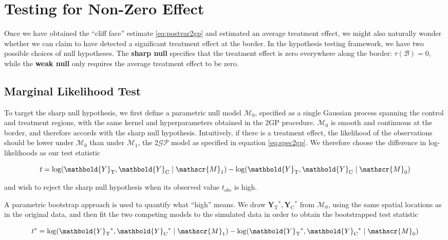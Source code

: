\documentclass[letter]{article}
\DeclarePairedDelimiter{\parenthesis}{\lparen}{\rparen}
\newcommand{\del}[1]{\parenthesis*{#1}}
\let\Pr\relax
\DeclareMathOperator{\Pr}{\mathbb{P}}
\newcommand{\gp}{\mathcal{GP}}
\newcommand{\treat}{\mathrm{T}}
\newcommand{\ctrol}{\mathrm{C}}
\newcommand{\Yvec}{\mathbold{Y}}
\newcommand{\yt}{\Yvec_{\treat}}
\newcommand{\yc}{\Yvec_{\ctrol}}
\newcommand{\border}{\mathcal{B}}
\newcommand{\modnull}{\mathscr{M}_0}
\newcommand{\modalt}{\mathscr{M}_1}
\begin{document}
    	\section{Testing for Non-Zero Effect}\label{testing-for-non-zero-effect}
    

\label{sec:hypothesis_testing}
    	Once we have obtained the ``cliff face'' estimate \eqref{eq:postvar2gp} and estimated an average treatment effect, we might also naturally wonder whether we can claim to have detected a significant treatment effect at the border.
In the hypothesis testing framework, we have two possible choices of null hypotheses.
The \textbf{sharp null} specifies that the treatment effect is zero everywhere along the border:
\(\tau(\border)=0\),
while the \textbf{weak null} only requires the average treatment effect to be zero.
    


    	\subsection{Marginal Likelihood Test}\label{marginal-likelihood-test}

To target the sharp null hypothesis, we first define a parametric null model \(\modnull\),
specified as a single Gaussian process spanning the control and treatment regions,
with the same kernel and hyperparameters obtained in the 2GP procedure.
\(\modnull\) is smooth and continuous at the border,
and therefore accords with the sharp null hypothesis.
Intuitively, if there is a treatment effect,
the likelihood of the observations should be lower under \(\modnull\) than under \(\modalt\),
the 2\(\gp\) model as specified in equation \eqref{eq:spec2gp}.
We therefore choose the difference in log-likelihoods as our test statistic

\begin{equation}
    t = \log \Pr\del{\yt{}, \yc{} \mid \modalt} - \log \Pr\del{\yt{}, \yc{} \mid \modnull}
\end{equation}

and wish to reject the sharp null hypothesis when its observed value \(t_{obs}\) is high.

A parametric bootstrap approach is used to quantify what ``high'' means. We draw \(\yt{}^*,\yc{}^*\) from \(\modnull\),
using the same spatial locations as in the original data,
and then fit the two competing models to the simulated data in order to obtain the bootstrapped test statistic

\begin{equation}
    t^* = \log \Pr\del{\yt{}^*, \yc{}^* \mid \modalt} - \log \Pr\del{\yt{}^*, \yc{}^* \mid \modnull}
\end{equation}
\end{document}
